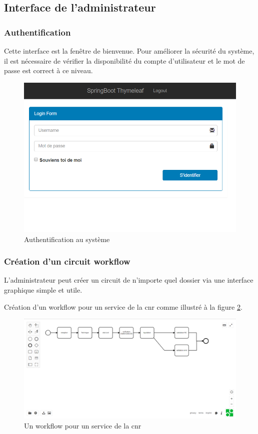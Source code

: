  

 \subsection{Interface de l'administrateur }
  \subsubsection{Authentification}
Cette interface est la fenêtre de bienvenue.
Pour améliorer la sécurité du système, il est nécessaire de vérifier la disponibilité du compte d'utilisateur et le mot de passe est correct à ce niveau.
 \begin{figure}[H]
 	\centering
 	\includegraphics[width=1\linewidth]{images/captures/capturesadmin/login}
 	\caption{Authentification au système }
 	\label{fig:login}
 \end{figure}
  
  
  
  
 \subsubsection{Création d'un circuit workflow}
L'administrateur peut créer un circuit de n'importe quel dossier via une interface graphique simple et utile.
\begin{exmp}
 Création d'un workflow pour un service de la \ac{cnr} comme illustré à la figure \ref{fig:bpmn}. 
\end{exmp}
 
\begin{figure}[H]
	\centering
	\includegraphics[width=1\linewidth]{images/captures/capturesadmin/bpmn}
	\caption{Un workflow pour un service de la \ac{cnr}}
	\label{fig:bpmn}
\end{figure}
  
